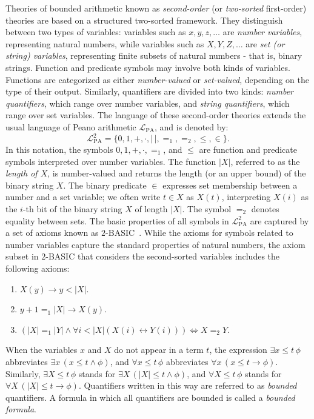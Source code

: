 \documentclass{article}
\theoremstyle{definition}
\theoremstyle{theorem}
\theoremstyle{theorem}
\theoremstyle{remark}
\theoremstyle{remark}
\theoremstyle{example}
\theoremstyle{notation}
\theoremstyle{theorem}
\begin{document}
Theories of bounded arithmetic known as \emph{second-order} (or \emph{two-sorted} first-order) theories are based on a structured two-sorted framework. They distinguish between two types of variables: variables such as $x, y, z, \ldots$ are \emph{number variables}, representing natural numbers, while variables such as $X, Y, Z, \ldots$ are \emph{set (or string) variables}, representing finite subsets of natural numbers - that is, binary strings. Function and predicate symbols may involve both kinds of variables. Functions are categorized as either \emph{number-valued} or \emph{set-valued}, depending on the type of their output. Similarly, quantifiers are divided into two kinds: \emph{number quantifiers}, which range over number variables, and \emph{string quantifiers}, which range over set variables. The language of these second-order theories extends the usual language of Peano arithmetic $\mathcal{L}_{\mathrm{PA}}$, and is denoted by:
$$
\mathcal{L}^2_{\mathrm{PA}} = \{0, 1, +, \cdot, \lvert\,\rvert, =_1, =_2, \leq, \in\}.
$$
In this notation, the symbols $0, 1, +, \cdot, =_1$, and $\leq$ are function and predicate symbols interpreted over number variables. The function $\lvert X \rvert$, referred to as the \emph{length of $X$}, is number-valued and returns the length (or an upper bound) of the binary string $X$. The binary predicate $\in$ expresses set membership between a number and a set variable; we often write $t \in X$ as $X(t)$, interpreting $X(i)$ as the $i$-th bit of the binary string $X$ of length $\lvert X \rvert$. The symbol $=_2$ denotes equality between sets. The basic properties of all symbols in $\mathcal{L}^2_{\mathrm{PA}}$ are captured by a set of axioms known as $2$-BASIC~\cite{10.5555/1734064}. While the axioms for symbols related to number variables capture the standard properties of natural numbers, the axiom subset in $2$-BASIC that considers the second-sorted variables includes the following axioms: 
\begin{enumerate}
\item $X(y)\to y<|X|$.
\item $y+1 =_1 |X|\to X(y)$.
\item $(|X|=_1|Y|\wedge \forall i<|X|(X(i)\leftrightarrow Y(i)))\iff X=_2Y$.
\end{enumerate}
When the variables $x$ and $X$ do not appear in a term $t$, the expression $\exists x \leq t\, \phi$ abbreviates $\exists x\, (x \leq t \wedge \phi)$, and $\forall x \leq t\, \phi$ abbreviates $\forall x\, (x \leq t \rightarrow \phi)$. Similarly, $\exists X \leq t\, \phi$ stands for $\exists X\, (\lvert X \rvert \leq t \wedge \phi)$, and $\forall X \leq t\, \phi$ stands for $\forall X\, (\lvert X \rvert \leq t \rightarrow \phi)$. Quantifiers written in this way are referred to as \emph{bounded} quantifiers. A formula in which all quantifiers are bounded is called a \emph{bounded formula}. 
\end{document}
